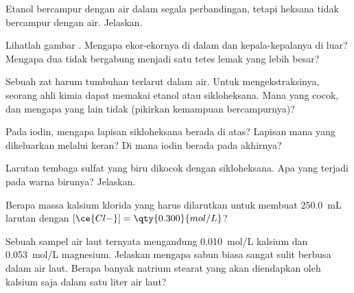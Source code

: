 \begin{exercise}[$\star\star$]\label{exo:g11:dissolution:7}
Etanol  bercampur dengan air dalam segala perbandingan,
tetapi heksana  tidak bercampur dengan air. Jelaskan.
\end{exercise}

\begin{exercise}[$\star\star$]\label{exo:g11:dissolution:8}
Lihatlah gambar . Mengapa ekor-ekornya di dalam dan
kepala-kepalanya di luar? Mengapa dua  tidak bergabung menjadi satu
tetes lemak yang lebih besar?
\end{exercise}

\begin{exercise}[$\star\star$]\label{exo:g11:dissolution:9}
Sebuah zat harum tumbuhan terlarut dalam air. Untuk mengekstraksinya,
seorang ahli kimia dapat memakai etanol atau sikloheksana. Mana yang
cocok, dan mengapa yang lain tidak (pikirkan kemampuan bercampurnya)?
\end{exercise}

\begin{exercise}[$\star\star$]\label{exo:g11:dissolution:10}
Pada  iodin, mengapa lapisan sikloheksana berada di atas?
Lapisan mana yang dikeluarkan melalui keran? Di mana iodin berada pada
akhirnya?
\end{exercise}

\begin{exercise}[$\star\star$]\label{exo:g11:dissolution:11}
Larutan tembaga sulfat yang biru dikocok dengan sikloheksana. Apa yang
terjadi pada warna birunya? Jelaskan.
\end{exercise}

\begin{exercise}[$\star\star\star$]\label{exo:g11:dissolution:12}
Berapa massa kalsium klorida yang harus dilarutkan untuk membuat
\qty{250.0}{mL} larutan dengan $[\ce{Cl-}] = \qty{0.300}{mol/L}$?
\end{exercise}

\begin{exercise}[$\star\star\star$]\label{exo:g11:dissolution:13}
Sebuah sampel air laut ternyata mengandung \qty{0.010}{mol/L} 
kalsium dan \qty{0.053}{mol/L}  magnesium. Jelaskan mengapa sabun
biasa sangat sulit berbusa dalam air laut. Berapa banyak natrium
stearat yang akan diendapkan oleh  kalsium saja dalam satu liter
air laut?
\end{exercise}

